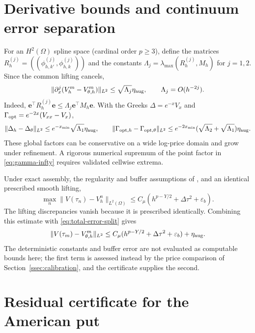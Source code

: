 \documentclass[supplement,hidelinks]{siamart251216}
\newcommand{\Mh}{M_h}
\newcommand{\dt}{\Delta\tau}
\newcommand{\ee}{\mathbf e}
\begin{document}
\section{Derivative bounds and continuum error separation}
\label{ssec:derivatives}\label{ssec:total-error}
For an $H^2(\Omega)$ spline space (cardinal order $p\ge3$), define the matrices
$R_h^{(j)}=((\phi_{h,k'}^{(j)},\phi_{h,k}^{(j)}))$ and the constants
$\Lambda_j=\lambda_{\max}(R_h^{(j)},\Mh)$ for $j=1,2$.
Since the common lifting cancels,
\[
 \|\partial_x^j(V_h^m-V_{\theta,h}^m)\|_{L^2}
 \le\sqrt{\Lambda_j}\eta_{\rm aug},
 \qquad \Lambda_j=O(h^{-2j}).
\]
Indeed, $\ee^\top R_h^{(j)}\ee\le\Lambda_j\ee^\top\Mh\ee$.
With the Greeks $\Delta=e^{-x}V_x$ and $\Gamma_{\rm opt}=e^{-2x}(V_{xx}-V_x)$,
\[
 \|\Delta_h-\Delta_\theta\|_{L^2}
 \le e^{-x_{\min}}\sqrt{\Lambda_1}\eta_{\rm aug},\qquad
 \|\Gamma_{{\rm opt},h}-\Gamma_{{\rm opt},\theta}\|_{L^2}
 \le e^{-2x_{\min}}(\sqrt{\Lambda_2}+\sqrt{\Lambda_1})\eta_{\rm aug}.
\]
These global factors can be conservative on a wide log-price domain and
grow under refinement. A rigorous numerical supremum of the point factor
in \eqref{eq:gamma-infty} requires validated cellwise extrema.

Under exact assembly, the regularity and buffer assumptions of
\cite{DamircheliCGMY2026}, and an identical prescribed smooth lifting,
\begin{equation}
 \max_n\|V(\tau_n)-V_h^n\|_{L^2(\Omega)}
 \le C_\mu(h^{p-Y/2}+\dt^2+\varepsilon_b).
 \label{eq:deterministic-error}
\end{equation}
The lifting discrepancies vanish because it is prescribed identically.
Combining this estimate with \eqref{eq:total-error-split} gives
\[
 \|V(\tau_m)-V_{\theta,h}^m\|_{L^2}
 \le C_\mu(h^{p-Y/2}+\dt^2+\varepsilon_b)+\eta_{\rm aug}.
\]
The deterministic constants and buffer error are not evaluated as
computable bounds here; the first term is assessed instead by the price comparison of
Section~\ref{ssec:calibration}, and the certificate supplies the second.

\section{Residual certificate for the American put}
\label{ssec:vi}

\end{document}
